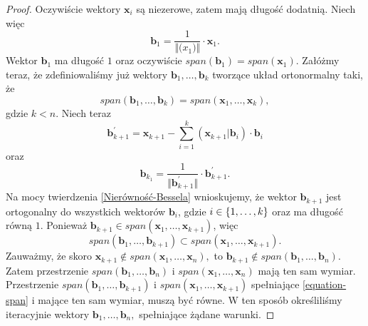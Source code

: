 \documentclass[12pt,a4paper]{report}
\newcommand{\vr}[1]{\mathbf{#1}}
\begin{document}
\begin{proof}
Oczywiście wektory $\vr{x}_{i}$ są niezerowe, zatem mają długość dodatnią. Niech więc
$$
\vr{b}_{1}=\frac{1}{\Vert\vr(x_{1})\Vert}\cdot\vr{x}_{1}.
$$
Wektor $\vr{b}_{1}$ ma długość $1$ oraz oczywiście $span(\vr{b}_{1}) = span (\vr{x}_{1})$. Załóżmy teraz, że zdefiniowaliśmy już wektory $\vr{b}_{1}, \ldots, \vr{b}_{k}$ tworzące układ ortonormalny taki, że
$$
span(\vr{b}_{1}, \ldots, \vr{b}_{k}) = span(\vr{x}_{1}, \ldots, \vr{x}_{k}),
$$
gdzie $k < n$.
Niech teraz 
$$
\vr{b}_{k+1}^{'} = \vr{x}_{k+1} - \sum_{i=1}^{k}(\vr{x}_{k+1}|\vr{b}_{i})\cdot \vr{b}_{i}
$$
oraz
$$
\vr{b}_{k_1} = \frac{1}{\Vert \vr{b}_{k+1}^{'} \Vert} \cdot \vr{b}_{k+1}^{'}.
$$
Na mocy twierdzenia \ref{Nierówność-Bessela} wnioskujemy, że wektor $\vr{b}_{k+1}$ jest ortogonalny do wszystkich wektorów $\vr{b}_{i}$, gdzie $i\in \left\lbrace {1, \ldots, k} \right\rbrace$ oraz ma długość równą $1$. Ponieważ $\vr{b}_{k+1}\in span(\vr{x}_{1}, \ldots, \vr{x}_{k+1})$, więc
\begin{equation} \label{equation-span}
span(\vr{b}_{1}, \ldots, \vr{b}_{k+1}) \subset span(\vr{x}_{1}, \ldots, \vr{x}_{k+1}).
\end{equation}
Zauważmy, że skoro $\vr{x}_{k+1} \notin span(\vr{x}_{1}, \ldots, \vr{x}_{n}),$ to $\vr{b}_{k+1} \notin span (\vr{b}_{1}, \ldots, \vr{b}_{n}).$ Zatem przestrzenie $span(\vr{b}_{1}, \ldots, \vr{b}_{n})$ i $span(\vr{x}_{1}, \ldots, \vr{x}_{n})$ mają ten sam wymiar.
Przestrzenie $span(\vr{b}_{1}, \ldots, \vr{b}_{k+1})$ i $span(\vr{x}_{1}, \ldots, \vr{x}_{k+1})$ spełniające \eqref{equation-span} i mające ten sam wymiar, muszą być równe.
W ten sposób określiliśmy iteracyjnie wektory $\vr{b}_{1}, \ldots, \vr{b}_{n},$ spełniające żądane warunki.
\end{proof}
\end{document}
